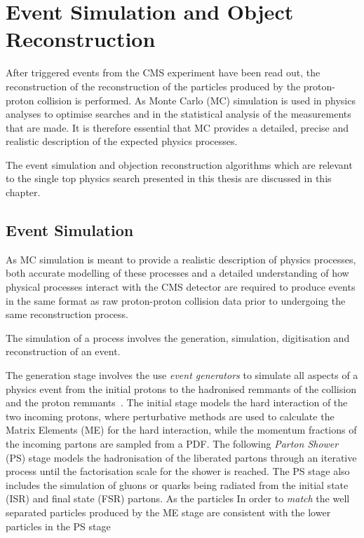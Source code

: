 \chapter{Event Simulation and Object Reconstruction}\label{chapter:data-mc}
After triggered events from the CMS experiment have been read out, the reconstruction of the reconstruction of the particles produced by the proton-proton collision is performed.
As Monte Carlo (MC) simulation is used in physics analyses to optimise searches and in the statistical analysis of the measurements that are made.
It is therefore essential that MC provides a detailed, precise and realistic description of the expected physics processes.
 
The event simulation and objection reconstruction algorithms which are relevant to the single top physics search presented in this thesis are discussed in this chapter.

\section{Event Simulation}\label{sec:sim}
As MC simulation is meant to provide a realistic description of physics processes, both accurate modelling of these processes and a detailed understanding of how physical processes interact with the CMS detector are required to produce events in the same format as raw proton-proton collision data prior to undergoing the same reconstruction process.


%
%


%

The simulation of a process involves the generation, simulation, digitisation and reconstruction of an event.

The generation stage involves the use \emph{event generators} to simulate all aspects of a physics event from the initial protons to the hadronised remmants of the collision and the proton 
remmants~\cite{Buckley:2011ms,Hoche:2014rga}.
The initial stage models the hard interaction of the two incoming protons, where perturbative methods are used to calculate the Matrix Elements (ME) for the hard interaction, while the momentum fractions of the incoming partons are sampled from a PDF.
The following \emph{Parton Shower} (PS) stage models the hadronisation of the liberated partons through an iterative process until the factorisation scale for the shower is reached.
The PS stage also includes the simulation of gluons or quarks being radiated from the initial state (ISR) and final state (FSR) partons.
As the particles 
In order to \emph{match} the well separated particles produced by the ME stage are consistent with the lower \pT particles in the PS stage

